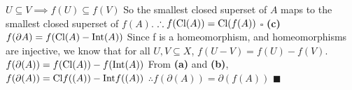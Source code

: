 \documentclass[12pt]{article}
\begin{document}
\(U \subseteq V \implies f(U) \subseteq f(V)\)
\newline
So the smallest closed superset of \(A\) maps to the smallest closed superset of \(f(A)\).
\newline
\(\therefore f(\textup{Cl}(A)) = \textup{Cl}(f(A))\)
\newline \(\square\) \newline \newline
\textbf{(c)}
\(f(\partial A) = f(\textup{Cl}(A) - \textup{Int}(A))\)
\newline
Since f is a homeomorphism, and homeomorphisms are injective, we know that for all \(U,V \subseteq X\), \(f(U - V) = f(U) - f(V)\).
\newline
\(f(\partial (A)) = f(\textup{Cl}(A)) - f(\textup{Int}(A))\)
\newline
From \textbf{(a)} and \textbf{(b)}, \(f(\partial (A)) = \textup{Cl}f((A)) - \textup{Int}f((A))\)
\newline
\(\therefore f(\partial (A)) = \partial(f(A))\)
\newline \(\blacksquare\)
\end{document}
